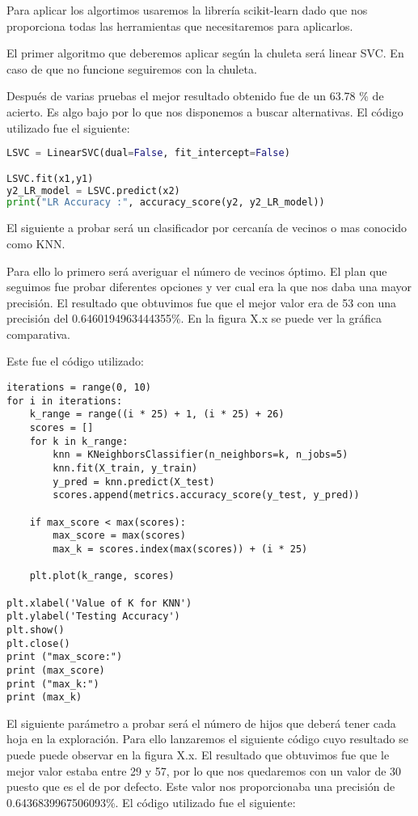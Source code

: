 Para aplicar los algortimos usaremos la librería scikit-learn dado que nos proporciona
todas las herramientas que necesitaremos para aplicarlos.

El primer algoritmo que deberemos aplicar según la chuleta será linear SVC. En caso
de que no funcione seguiremos con la chuleta.

Después de varias pruebas el mejor resultado obtenido fue de un 63.78 \% de acierto. Es
algo bajo por lo que nos disponemos a buscar alternativas. El código utilizado fue el siguiente:

\begin{lstlisting}[language=python]
LSVC = LinearSVC(dual=False, fit_intercept=False)

LSVC.fit(x1,y1)
y2_LR_model = LSVC.predict(x2)
print("LR Accuracy :", accuracy_score(y2, y2_LR_model))
\end{lstlisting}

El siguiente a probar será un clasificador por cercanía de vecinos o mas conocido como KNN.

Para ello lo primero será averiguar el número de vecinos óptimo. El plan que seguimos
fue probar diferentes opciones y ver cual era la que nos daba una mayor precisión. El resultado
que obtuvimos fue que el mejor valor era de 53 con una precisión del 0.6460194963444355\%.
En la figura X.x se puede ver la gráfica comparativa.

Este fue el código utilizado:

\begin{lstlisting}
iterations = range(0, 10)
for i in iterations:
    k_range = range((i * 25) + 1, (i * 25) + 26)
    scores = []
    for k in k_range:
        knn = KNeighborsClassifier(n_neighbors=k, n_jobs=5)
        knn.fit(X_train, y_train)
        y_pred = knn.predict(X_test)
        scores.append(metrics.accuracy_score(y_test, y_pred))

    if max_score < max(scores):
        max_score = max(scores)
        max_k = scores.index(max(scores)) + (i * 25)

    plt.plot(k_range, scores)

plt.xlabel('Value of K for KNN')
plt.ylabel('Testing Accuracy')
plt.show()
plt.close()
print ("max_score:")
print (max_score)
print ("max_k:")
print (max_k)
\end{lstlisting}

El siguiente parámetro a probar será el número de hijos que deberá tener
cada hoja en la exploración. Para ello lanzaremos el siguiente código cuyo
resultado se puede puede observar en la figura X.x. El resultado que obtuvimos
fue que le mejor valor estaba entre 29 y 57, por lo que nos quedaremos con un valor
de 30 puesto que es el de por defecto. Este valor nos proporcionaba una precisión
de 0.6436839967506093\%. El código utilizado fue el siguiente:


